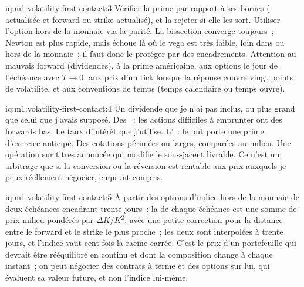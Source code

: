 \begin{solution}{iq:m1:volatility-first-contact:3}
Vérifier la prime par rapport à ses bornes ( actualisée et
forward ou strike actualisé), et la rejeter si elle les sort. Utiliser l'option hors de
la monnaie via la parité. La bissection converge toujours~; Newton est plus rapide, mais
échoue là où le vega est très faible, loin dans ou hors de la monnaie~; il faut donc le
protéger par des encadrements. Attention au mauvais forward (dividendes), à la prime
américaine, aux options le jour de l'échéance avec $T \to 0$, aux prix d'un tick lorsque
la réponse couvre vingt points de volatilité, et aux conventions de temps (temps
calendaire ou temps ouvré).
\end{solution}

\begin{solution}{iq:m1:volatility-first-contact:4}
Un dividende que je n'ai pas inclus, ou plus grand que celui que j'avais supposé. Des ~: les actions difficiles à emprunter ont des forwards bas. Le taux d'intérêt que
j'utilise. L'~: le put porte une prime d'exercice anticipé. Des cotations
périmées ou larges, comparées au milieu. Une opération sur titres annoncée qui modifie
le sous-jacent livrable. Ce n'est un arbitrage que si la conversion ou la réversion
est rentable aux prix auxquels je peux réellement négocier, emprunt compris.
\end{solution}

\begin{solution}{iq:m1:volatility-first-contact:5}
À partir des options d'indice hors de la monnaie de deux échéances encadrant
trente jours~: la  de chaque échéance est une somme de prix milieu pondérés
par $\Delta K/K^2$, avec une petite correction pour la distance entre le forward et
le strike le plus proche~; les deux  sont interpolées à trente jours, et
l'indice vaut cent fois la racine carrée. C'est le prix d'un portefeuille qui devrait être
rééquilibré en continu et dont la composition change à chaque instant~; on peut négocier
des contrats à terme et des options sur lui, qui évaluent sa valeur future, et non
l'indice lui-même.
\end{solution}


